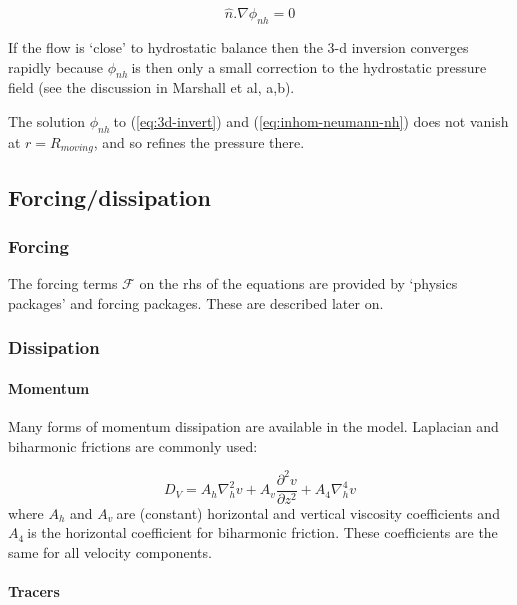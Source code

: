 \begin{equation}
\widehat{n}.\nabla \phi _{nh}=0  \label{eq:hom-neumann-nh}
\end{equation}

If the flow is `close' to hydrostatic balance then the 3-d inversion
converges rapidly because $\phi _{nh}\ $is then only a small correction to
the hydrostatic pressure field (see the discussion in Marshall et al, a,b).

The solution $\phi _{nh}\ $to (\ref{eq:3d-invert}) and (\ref{eq:inhom-neumann-nh})
does not vanish at $r=R_{moving}$, and so refines the pressure there.

\subsection{Forcing/dissipation}

\subsubsection{Forcing}

The forcing terms $\mathcal{F}$ on the rhs of the equations are provided by
`physics packages' and forcing packages. These are described later on.

\subsubsection{Dissipation}

\paragraph{Momentum}

Many forms of momentum dissipation are available in the model. Laplacian and
biharmonic frictions are commonly used:

\begin{equation}
D_{V}=A_{h}\nabla _{h}^{2}v+A_{v}\frac{\partial ^{2}v}{\partial z^{2}}
+A_{4}\nabla _{h}^{4}v  \label{eq:dissipation}
\end{equation}
where $A_{h}$ and $A_{v}\ $are (constant) horizontal and vertical viscosity
coefficients and $A_{4}\ $is the horizontal coefficient for biharmonic
friction. These coefficients are the same for all velocity components.

\paragraph{Tracers}

